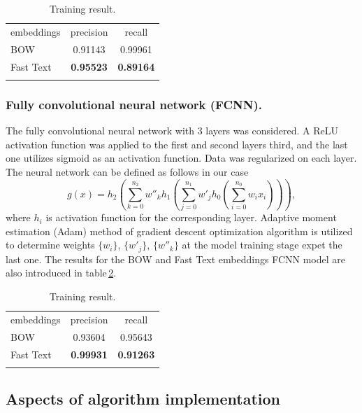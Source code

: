 \documentclass[12pt]{jpconf}
\begin{document}
\begin{table}[h!]
	\centering
	\caption{\label{tbl:01}Training result.}
	\begin{center}
		\begin{tabular}{lcc}
			\mr
			embeddings & precision & recall \\
			\mr
			BOW & 0.91143 & 0.99961 \\ \hline
			Fast Text & \bf 0.95523 & \bf 0.89164 \\ 
			\mr
		\end{tabular}
	\end{center}
\end{table}

\subsubsection*{Fully convolutional neural network (FCNN).}

The fully convolutional neural network with 3 layers was considered. A \textsf{ReLU} activation function was applied to the first and second layers third, and the last one utilizes \textsf{sigmoid} as an activation function. Data was regularized on each layer. The neural network can be defined as follows in our case
$$
g(x) = h_2 \left(\sum_{k=0}^{n_2} w''_k h_1\left(\sum_{j=0}^{n_1} w'_j h_0\left( \sum_{i=0}^{n_0} w_i x_i \right)\right)\right),
$$
where $h_i$ is activation function for the corresponding layer. Adaptive moment estimation (Adam) method of gradient descent optimization algorithm is utilized to determine weights $\{w_i\}$, $\{w'_j\}$, $\{w''_k\}$ at the model training stage expet the last one.
The results for the BOW and Fast Text embeddings FCNN model are also introduced in table\,\ref{tbl:02}.

\begin{table}[h!]
	\centering
	\caption{\label{tbl:02}Training result.}
	\begin{center}
		\begin{tabular}{lcc}
			\mr
			embeddings & precision & recall \\
			\mr
			BOW & 0.93604 & 0.95643 \\ \hline
			Fast Text & \bf 0.99931 & \bf 0.91263 \\ 
			\mr
		\end{tabular}
	\end{center}
\end{table}


\subsection{Aspects of algorithm implementation}
\end{document}
